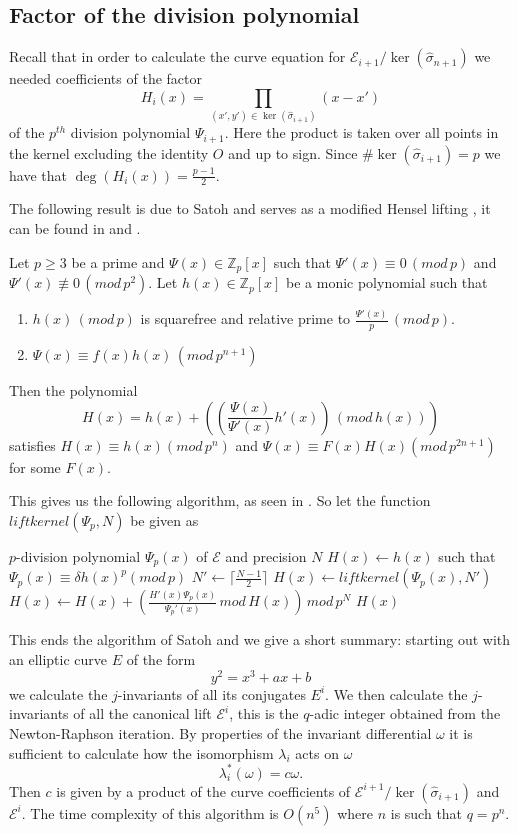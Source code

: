 \subsection{Factor of the division polynomial} \label{satohdiv}
Recall that in order to calculate the curve equation for $\mathscr{E}_{i+1}/\ker(\widehat{\sigma}_{n+1})$
we needed coefficients of the factor
$$H_i(x) = \prod_{(x',y')\in \ker(\widehat{\sigma}_{i+1})} (x-x')$$
of the $p^{th}$ division polynomial $\Psi_{i+1}$. Here the product is taken over all points in
the kernel excluding the identity $O$ and up to sign. Since $\#\ker(\widehat{\sigma}_{i+1}) = p$ we have
that $\deg(H_i(x)) = \frac{p-1}{2}$.

The following result is due to Satoh and serves as a modified Hensel lifting \cite{Robert}, it can be found
in \cite{Satoh} and \cite{Handbook}.
\begin{prop}
 Let $p\geq 3$ be a prime and $\Psi(x) \in \mathbb{Z}_p[x]$ such that $\Psi'(x) \equiv 0\, (mod\, p)$ and
$\Psi'(x) \not\equiv 0\, (mod\, p^2)$. Let $h(x) \in \mathbb{Z}_p[x]$ be a monic polynomial such that
\begin{enumerate}
  \item $h(x) \,(mod\,p)$ is squarefree and relative prime to $\frac{\Psi'(x)}{p}\,(mod\,p)$.
  \item $\Psi(x) \equiv f(x)h(x)\,(mod\,p^{n+1})$
\end{enumerate}
Then the polynomial
$$H(x) = h(x) + \left(\left(\frac{\Psi(x)}{\Psi'(x)} h'(x)\right)\,(mod\, h(x))\right)$$
satisfies $H(x) \equiv h(x) (mod\, p^n)$ and $\Psi(x) \equiv F(x)H(x) (mod \, p^{2n+1})$ for some $F(x)$.
\end{prop}
This gives us the following algorithm, as seen in \cite{Handbook}. So let the function
$liftkernel(\Psi_p, N)$ be given as
\begin{algorithmic}
\REQUIRE $p$-division polynomial $\Psi_p(x)$ of $\mathscr{E}$ and precision $N$
        \STATE $H(x)\gets h(x)$ such that $\Psi_p(x) \equiv \delta h(x)^p (mod\, p)$
\ELSE
        \STATE $N'\gets \lceil\frac{N-1}{2}\rceil$
	\STATE $H(x)\gets liftkernel(\Psi_p(x), N')$
	\STATE $H(x)\gets H(x) + \left(\frac{H'(x)\Psi_p(x)}{\Psi_p'(x)} \, mod\, H(x) \right)\, mod\, p^N$
\ENDIF
\RETURN $H(x)$
\end{algorithmic}
This ends the algorithm of Satoh and we give a short summary: starting out with
an elliptic curve $E$ of the form $$y^2 = x^3 + ax + b$$ we calculate the $j$-invariants of
all its conjugates $E^i$. We then calculate the $j$-invariants of all the canonical lift $\mathscr{E}^i$,
this is the $q$-adic integer obtained from the Newton-Raphson iteration. By properties of the
invariant differential $\omega$ it is sufficient to calculate how the isomorphism $\lambda_i$ acts on
$\omega$
$$\lambda_i^*(\omega) = c\omega.$$
Then $c$ is given by a product of the curve coefficients of
$\mathscr{E}^{i+1}/\ker(\widehat{\sigma}_{i+1})$ and $\mathscr{E}^i$.
The time complexity of this algorithm is $O(n^5)$ where $n$ is such that $q = p^n$.